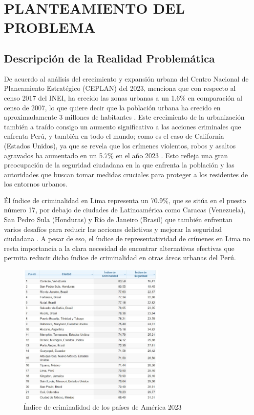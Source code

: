 \chapter{PLANTEAMIENTO DEL PROBLEMA}
\section{Descripción de la Realidad Problemática}

De acuerdo al análisis del crecimiento y expansión urbana del Centro Nacional de Planeamiento Estratégico (CEPLAN) del 2023, menciona que con respecto al censo 2017 del INEI, ha crecido las zonas urbanas a un 1.6\% en comparación al censo de 2007, lo que quiere decir que la población urbana ha crecido en aproximadamente 3 millones de habitantes \parencite{cu_ceplan}. Este crecimiento de la urbanización también a traído consigo un aumento significativo a las acciones criminales que enfrenta Perú, y también en todo el mundo; como es el caso de California (Estados Unidos), ya que se revela que los crímenes violentos, robos y asaltos agravados ha aumentado en un 5.7\% en el año 2023 \parencite{tec_PPIC}. Esto refleja una gran preocupación de la seguridad ciudadana en la que enfrenta la población y las autoridades que buscan tomar medidas cruciales para proteger a los residentes de los entornos urbanos. 

Él índice de criminalidad en Lima representa un 70.9\%, que se sitúa en el puesto número 17, por debajo de ciudades de Latinoamérica como Caracas (Venezuela), San Pedro Sula (Honduras) y Río de Janeiro (Brasil) que también enfrentan varios desafíos para reducir las acciones delictivas y mejorar la seguridad ciudadana \parencite{cu_numbeo2023}. A pesar de eso, el índice de representatividad de crímenes en Lima no resta importancia a la clara necesidad de encontrar alternativas efectivas que permita reducir dicho índice de criminalidad en otras áreas urbanas del Perú.%
\begin{figure}[h]
	\begin{center}
		\includegraphics[width=0.65\textwidth]{1/figures/fig11.jpg}
		\caption{Índice de criminalidad de los países de América 2023}
		\label{1:fig}
	\end{center}
\end{figure}

